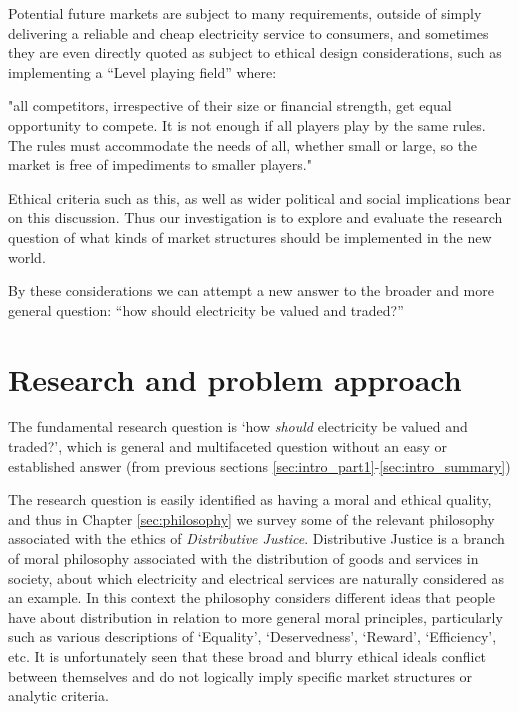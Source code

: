 Potential future markets are subject to many requirements, outside of simply delivering a reliable and cheap electricity service to consumers, and sometimes they are even directly quoted as subject to ethical design considerations, such as implementing a ``Level playing field'' where:

"all competitors, irrespective of their size or financial strength, get equal opportunity to compete. It is not enough if all players play by the same rules. The rules must accommodate the needs of all, whether small or large, so the market is free of impediments to smaller players." \cite{australianenergymarketoperatorlimited2018}

Ethical criteria such as this, as well as wider political and social implications bear on this discussion. 
Thus our investigation is to explore and evaluate the research question of what kinds of market structures should be implemented in the new world.


\noindent By these considerations we can attempt a new answer to the broader and more general question: ``how should electricity be valued and traded?''


\section{Research and problem approach}

The fundamental research question is `how \textit{should} electricity be valued and traded?', which is general and multifaceted question without an easy or established answer (from previous sections \ref{sec:intro_part1}-\ref{sec:intro_summary})

The research question is easily identified as having a moral and ethical quality, and thus in Chapter \ref{sec:philosophy} we survey some of the relevant philosophy associated with the ethics of \textit{Distributive Justice}.
Distributive Justice is a branch of moral philosophy associated with the distribution of goods and services in society, about which electricity and electrical services are naturally considered as an example.
In this context the philosophy considers different ideas that people have about distribution in relation to more general moral principles, particularly such as various descriptions of `Equality', `Deservedness', `Reward', `Efficiency', etc.
It is unfortunately seen that these broad and blurry ethical ideals conflict between themselves and do not logically imply specific market structures or analytic criteria.


